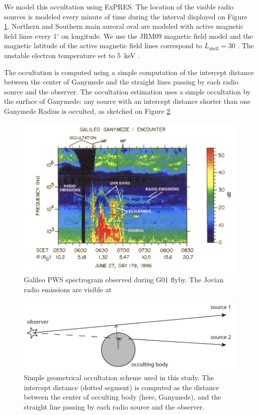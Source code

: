 \documentclass[referee]{aa}
\begin{document}
We model this occultation using ExPRES. The location of the visible radio sources is modeled every minute of time during the interval displayed on Figure \ref{fig:g01}. Northern and Southern main auroral oval are modeled with active magnetic field lines every 1$^\circ$ on longitude.  We use the JRM09 magnetic field model \citep{Connerney:2018jx} and the magnetic latitude of the active magnetic field lines correspond to $L_\textrm{shell}=30$ \citep{Grodent:2015eo}. The unstable electron temperature set to 5~keV \citep{Louarn:2017bc}. 

The occultation is computed using a simple computation of the intercept distance between the center of Ganymede and the straight lines passing by each radio source and the observer. The occultation estimation uses a simple occultation by the surface of Ganymede: any source with an intercept distance shorter than one Ganymede Radius is occulted, as sketched on Figure \ref{fig:occult}.


\begin{figure}
\includegraphics[width=\linewidth]{gll-g01.png}
\caption{Galileo PWS spectrogram observed during G01 flyby. The Jovian radio emissions are visible at }\label{fig:g01}
\end{figure}

\begin{figure}
\includegraphics[width=0.7\linewidth]{occult.pdf}
\caption{Simple geometrical occultation scheme used in this study. The intercept distance (dotted segment) is computed as the distance between the center of occulting body (here, Ganymede), and the straight line passing by each radio source and the observer.}\label{fig:occult}
\end{figure}



\end{document}
